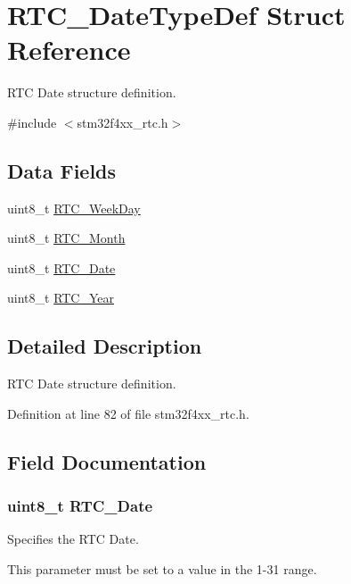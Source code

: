 \hypertarget{struct_r_t_c___date_type_def}{\section{R\-T\-C\-\_\-\-Date\-Type\-Def Struct Reference}
\label{struct_r_t_c___date_type_def}
}


R\-T\-C Date structure definition.  




{\ttfamily \#include $<$stm32f4xx\-\_\-rtc.\-h$>$}

\subsection*{Data Fields}
\begin{DoxyCompactItemize}
\item 
uint8\-\_\-t \hyperlink{struct_r_t_c___date_type_def_a11187916c6ecdc5464df15561f9f67f8}{R\-T\-C\-\_\-\-Week\-Day}
\item 
uint8\-\_\-t \hyperlink{struct_r_t_c___date_type_def_a8f0d023494a7f66ec535d97b14d34363}{R\-T\-C\-\_\-\-Month}
\item 
uint8\-\_\-t \hyperlink{struct_r_t_c___date_type_def_a0fa309adbe7cb00f5559f123637db5d5}{R\-T\-C\-\_\-\-Date}
\item 
uint8\-\_\-t \hyperlink{struct_r_t_c___date_type_def_a1dee45ae66ca3892b6a1fdc78d12cc27}{R\-T\-C\-\_\-\-Year}
\end{DoxyCompactItemize}


\subsection{Detailed Description}
R\-T\-C Date structure definition. 

Definition at line 82 of file stm32f4xx\-\_\-rtc.\-h.



\subsection{Field Documentation}
\hypertarget{struct_r_t_c___date_type_def_a0fa309adbe7cb00f5559f123637db5d5}{
\subsubsection[{R\-T\-C\-\_\-\-Date}]{\setlength{\rightskip}{0pt plus 5cm}uint8\-\_\-t R\-T\-C\-\_\-\-Date}}\label{struct_r_t_c___date_type_def_a0fa309adbe7cb00f5559f123637db5d5}
\begin{DoxyVerb} Specifies the RTC Date.
\end{DoxyVerb}
 This parameter must be set to a value in the 1-\/31 range. 

